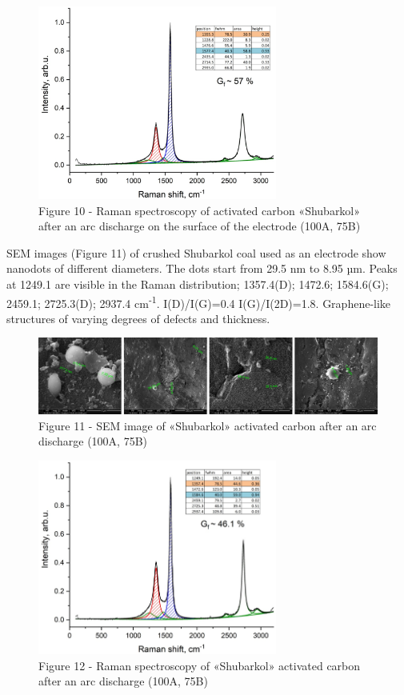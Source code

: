 \begin{figure}[H]
	\centering
	\includegraphics[width=0.7\textwidth]{assets/62}
	\caption*{Figure 10 - Raman spectroscopy of activated carbon «Shubarkol» after an arc discharge on the surface of the electrode (100A, 75B)}
\end{figure}

\begin{multicols}{2}
SEM images (Figure 11) of crushed Shubarkol coal used as an electrode
show nanodots of different diameters. The dots start from 29.5 nm to
8.95 µm. Peaks at 1249.1 are visible in the Raman distribution;
1357.4(D); 1472.6; 1584.6(G); 2459.1; 2725.3(D); 2937.4
cm\textsuperscript{-1}. I(D)/I(G)=0.4 I(G)/I(2D)=1.8. Graphene-like
structures of varying degrees of defects and thickness.
\end{multicols}

\begin{figure}[H]
	\centering
	\includegraphics[width=\textwidth]{assets/63}
	\caption*{Figure 11 - SEM image of «Shubarkol» activated carbon after an arc discharge (100A, 75B)}
\end{figure}

\begin{figure}[H]
	\centering
	\includegraphics[width=0.7\textwidth]{assets/64}
	\caption*{Figure 12 - Raman spectroscopy of «Shubarkol» activated carbon after an arc discharge (100A, 75B)}
\end{figure}

